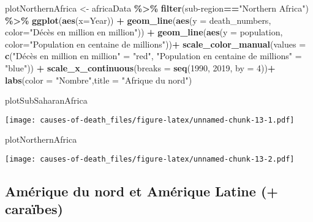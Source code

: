 \documentclass[
]{article}
\newenvironment{Shaded}{\begin{snugshade}}{\end{snugshade}}
\newcommand{\AttributeTok}[1]{\textcolor[rgb]{0.13,0.29,0.53}{#1}}
\newcommand{\DecValTok}[1]{\textcolor[rgb]{0.00,0.00,0.81}{#1}}
\newcommand{\FunctionTok}[1]{\textcolor[rgb]{0.13,0.29,0.53}{\textbf{#1}}}
\newcommand{\NormalTok}[1]{#1}
\newcommand{\OtherTok}[1]{\textcolor[rgb]{0.56,0.35,0.01}{#1}}
\newcommand{\SpecialCharTok}[1]{\textcolor[rgb]{0.81,0.36,0.00}{\textbf{#1}}}
\newcommand{\StringTok}[1]{\textcolor[rgb]{0.31,0.60,0.02}{#1}}
\begin{document}
\begin{Shaded}
\begin{Highlighting}[]
\NormalTok{plotNorthernAfrica }\OtherTok{\textless{}{-}}\NormalTok{ africaData }\SpecialCharTok{\%\textgreater{}\%}
  \FunctionTok{filter}\NormalTok{(}\StringTok{\textasciigrave{}}\AttributeTok{sub{-}region}\StringTok{\textasciigrave{}}\SpecialCharTok{==}\StringTok{"Northern Africa"}\NormalTok{) }\SpecialCharTok{\%\textgreater{}\%}
  \FunctionTok{ggplot}\NormalTok{(}\FunctionTok{aes}\NormalTok{(}\AttributeTok{x=}\NormalTok{Year)) }\SpecialCharTok{+} 
  \FunctionTok{geom\_line}\NormalTok{(}\FunctionTok{aes}\NormalTok{(}\AttributeTok{y =}\NormalTok{ death\_numbers, }\AttributeTok{color=}\StringTok{"Décès en million en million"}\NormalTok{)) }\SpecialCharTok{+}
  \FunctionTok{geom\_line}\NormalTok{(}\FunctionTok{aes}\NormalTok{(}\AttributeTok{y =}\NormalTok{ population, }\AttributeTok{color=}\StringTok{"Population en centaine de millions"}\NormalTok{))}\SpecialCharTok{+}
  \FunctionTok{scale\_color\_manual}\NormalTok{(}\AttributeTok{values =} \FunctionTok{c}\NormalTok{(}\StringTok{"Décès en million en million"} \OtherTok{=} \StringTok{"red"}\NormalTok{, }\StringTok{"Population en centaine de millions"} \OtherTok{=} \StringTok{"blue"}\NormalTok{)) }\SpecialCharTok{+}
  \FunctionTok{scale\_x\_continuous}\NormalTok{(}\AttributeTok{breaks =} \FunctionTok{seq}\NormalTok{(}\DecValTok{1990}\NormalTok{, }\DecValTok{2019}\NormalTok{, }\AttributeTok{by =} \DecValTok{4}\NormalTok{))}\SpecialCharTok{+}
  \FunctionTok{labs}\NormalTok{(}\AttributeTok{color =} \StringTok{"Nombre"}\NormalTok{,}\AttributeTok{title =} \StringTok{"Afrique du nord"}\NormalTok{)}

\NormalTok{plotSubSaharanAfrica}
\end{Highlighting}
\end{Shaded}

\texttt{[image: causes-of-death\_files/figure-latex/unnamed-chunk-13-1.pdf]}

\begin{Shaded}
\begin{Highlighting}[]
\NormalTok{plotNorthernAfrica}
\end{Highlighting}
\end{Shaded}

\texttt{[image: causes-of-death\_files/figure-latex/unnamed-chunk-13-2.pdf]}

\hypertarget{amuxe9rique-du-nord-et-amuxe9rique-latine-carauxefbes}{%
\subsection{Amérique du nord et Amérique Latine (+
caraïbes)}\label{amuxe9rique-du-nord-et-amuxe9rique-latine-carauxefbes}}
\end{document}
